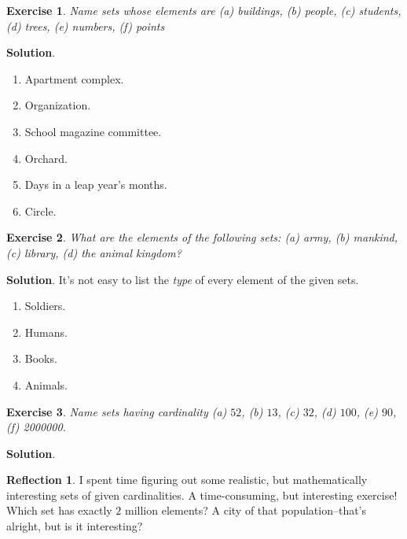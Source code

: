 \documentclass[11pt]{book}
\theoremstyle{definition}
\theoremstyle{plain}
\newtheorem{exercise}{Exercise}
\theoremstyle{definition}
\theoremstyle{problemstyle}
\theoremstyle{remark}
\theoremstyle{definition}
\newtheorem{reflection}{Reflection}
\begin{document}
\begin{exercise}
    Name sets whose elements are (a) buildings, (b) people, (c) students, (d) trees, (e) numbers, (f) points
    \label{ex:1.2.1}
\end{exercise}
\textbf{Solution}.
\begin{enumerate}[label=({\alph*})]
    \item Apartment complex.
    \item Organization.
    \item School magazine committee.
    \item Orchard.
    \item Days in a leap year's months.
    \item Circle.
\end{enumerate}
\begin{exercise}
    What are the elements of the following sets: (a) army, (b) mankind, (c) library, (d) the animal kingdom?
    \label{ex:1.2.2}
\end{exercise}
\textbf{Solution}.
It's not easy to list the \emph{type} of every element of the given sets.
\begin{enumerate}[label=({\alph*})]
    \item Soldiers.
    \item Humans.
    \item Books.
    \item Animals.
\end{enumerate}
\begin{exercise}
    Name sets having cardinality (a) $52$, (b) $13$, (c) $32$, (d) $100$, (e) $90$, (f) \num{2000000}.
    \label{ex:1.2.3}
\end{exercise}
\textbf{Solution}.
\begin{reflection}
    I spent time figuring out some realistic, but mathematically interesting sets of given cardinalities. A time-consuming, but interesting exercise! Which set has exactly $2$ million elements? A city of that population--that's alright, but is it interesting?
\end{reflection}
\end{document}
